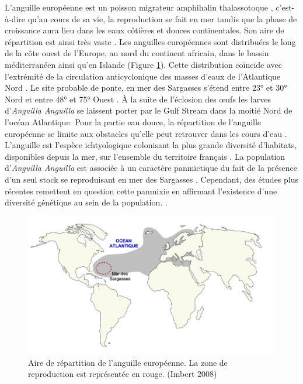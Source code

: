 \documentclass[11pt,titlepage,twoside]{article}\usepackage[]{graphicx}\usepackage[table]{xcolor}
\begin{document}
L’anguille européenne est un poisson migrateur amphihalin thalassotoque \citep{adam_anguille_2008, brusle_anguille_1994, elie_migration_1994}, c’est- à-dire qu’au cours de sa vie, la reproduction se fait en mer tandis que la phase de croissance aura lieu dans les eaux côtières et douces continentales. Son aire de répartition est ainsi très vaste \citep{durif_migration_2003}. Les anguilles européennes sont distribuées le long de la côte ouest de l’Europe, au nord du continent africain, dans le bassin méditerranéen ainsi qu’en Islande (Figure \ref{Aire}). Cette distribution coïncide avec l’extrémité de la circulation anticyclonique des masses d’eaux de l’Atlantique Nord \citep{anthony_bases_2006}. Le site probable de ponte, en mer des Sargasses s’étend entre 23° et 30° Nord et entre 48° et 75° Ouest \citep{mccleave_reproductive_1987}. À la suite de l’éclosion des œufs les larves d’\textit{Anguilla Anguilla} se laissent porter par le Gulf Stream dans la moitié Nord de l’océan Atlantique. Pour la partie eau douce, la répartition de l’anguille européenne se limite aux obstacles qu’elle peut retrouver dans les cours d’eau \citep{adam_anguille_1997}. L’anguille est l’espèce ichtyologique colonisant la plus grande diversité d’habitats, disponibles depuis la mer, sur l’ensemble du territoire français \citep{laffaille_spatial_2003, laffaille_habitat_2004}. La population d’\textit{Anguilla Anguilla} est associée à un caractère panmictique du fait de la présence d’un seul stock se reproduisant en mer des Sargasses \citep{schmidt_ivbreeding_1922}. Cependant, des études plus récentes remettent en question cette panmixie en affirmant l’existence d’une diversité génétique au sein de la population. \citep{farrugio_etat_2011, pujolar_genetic_2007, daemen_analysis_2001}.

\begin{figure}[htpb]
\centering
\includegraphics[width=\textwidth]{Aire}
\caption{Aire de répartition de l'anguille européenne. La zone de reproduction est représentée en rouge. (Imbert 2008)}
\label{Aire}
\end{figure}
\end{document}
